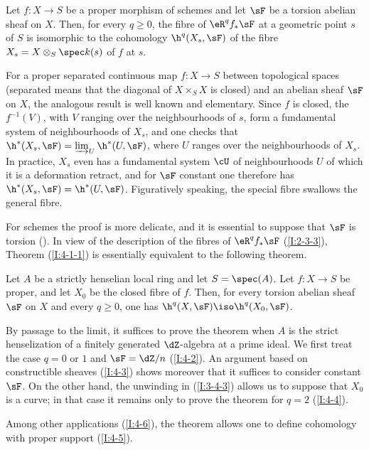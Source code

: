 \begin{theorem}\label{I:4-1-1}
Let $f:X\to S$ be a proper morphism of schemes and let $\sF$ be a
torsion abelian sheaf on $X$. Then, for every $q\geqslant0$, the fibre
of $\eR^qf_*\sF$ at a geometric point $s$ of $S$ is isomorphic to the
cohomology $\h^q(X_s,\sF)$ of the fibre
$X_s=X\otimes_S\spec k(s)$ of $f$ at $s$.
\end{theorem}

For a proper separated continuous map $f:X\to S$ between topological
spaces (separated means that the diagonal of $X\times_SX$ is closed) and
an abelian sheaf $\sF$ on $X$, the analogous result is well known and
elementary. Since $f$ is closed, the $f^{-1}(V)$, with $V$ ranging over
the neighbourhoods of $s$, form a fundamental system of neighbourhoods
of $X_s$, and one checks that
$\h^*(X_s,\sF)=\varinjlim_U\h^*(U,\sF)$, where $U$ ranges
over the neighbourhoods of $X_s$. In practice, $X_s$ even has a
fundamental system $\cU$ of neighbourhoods $U$ of which it is a
deformation retract, and for $\sF$ constant one therefore has
$\h^*(X_s,\sF)=\h^*(U,\sF)$. Figuratively speaking, the
special fibre swallows the general fibre.

For schemes the proof is more delicate, and it is essential to suppose
that $\sF$ is torsion (\cite[XII.2]{sga4}). In view of the description of
the fibres of $\eR^qf_*\sF$ (\ref{I:2-3-3}), Theorem
(\ref{I:4-1-1}) is essentially equivalent to the following theorem.

\begin{theorem}\label{I:4-1-2}
Let $A$ be a strictly henselian local ring and let $S=\spec(A)$. Let
$f:X\to S$ be proper, and let $X_0$ be the closed fibre of $f$. Then, for every
torsion abelian sheaf $\sF$ on $X$ and every $q\geqslant0$, one has
$\h^q(X,\sF)\iso\h^q(X_0,\sF)$.
\end{theorem}

By passage to the limit, it suffices to prove the theorem when $A$ is the
strict henselization of a finitely generated $\dZ$-algebra at a prime
ideal. We first treat the case $q=0$ or $1$ and $\sF=\dZ/n$
(\ref{I:4-2}). An argument based on constructible sheaves (\ref{I:4-3})
shows moreover that it suffices to consider constant $\sF$. On the other
hand, the unwinding in (\ref{I:3-4-3}) allows us to suppose that $X_0$
is a curve; in that case it remains only to prove the theorem for $q=2$
(\ref{I:4-4}).

Among other applications (\ref{I:4-6}), the theorem allows one to define
cohomology with proper support (\ref{I:4-5}).

